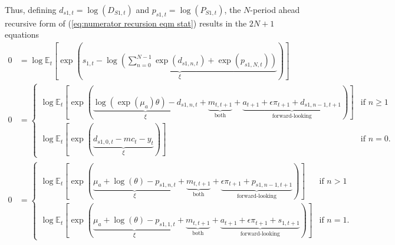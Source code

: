 \documentclass[12 pt, oneside]{article}
\theoremstyle{definition}
\theoremstyle{definition}
\theoremstyle{definition}
\newcommand{\E}{\mathbb{E}}
\begin{document}
Thus, defining $d_{s1, t} = \log(D_{S1, t})$ and $p_{s1, t} = \log(P_{S1, t})$,
the $N$-period ahead recursive form of (\ref{eq:numerator recursion eqm stat}) results in the $2N + 1$ equations
\begin{align}
  0 & = \log\E_t\left[\exp\left(\underbrace{s_{1, t} - \log\left(\sum_{n = 0}^{N - 1}\exp(d_{s1, n, t}) + \exp(p_{s1, N, t})\right)}_{\xi}\right)\right]\\
  0 & =
      \begin{cases}
        \log\E_t\left[\exp\left(\underbrace{\log(\exp(\mu_a)\theta) - d_{s1, n, t}}_{\xi} + \underbrace{m_{t, t + 1}}_{\text{both}} + \underbrace{a_{t + 1} + \epsilon \pi_{t + 1} + d_{s1, n - 1, t + 1}}_{\text{forward-looking}}\right)\right] & \text{if } n \geq 1\\
        \log\E_t\left[\exp\left(\underbrace{d_{s1, 0, t} - mc_t - y_t}_{\xi}\right)\right] & \text{if } n = 0.
      \end{cases}\\
  0 & =
      \begin{cases}
        \log\E_t\left[\exp\left(\underbrace{\mu_a + \log(\theta) - p_{s1, n, t}}_{\xi} + \underbrace{m_{t, t + 1}}_{\text{both}} + \underbrace{\epsilon \pi_{t + 1} + p_{s1, n - 1, t + 1}}_{\text{forward-looking}} \right)\right] & \text{if } n > 1\\
        \log\E_t\left[\exp\left(\underbrace{\mu_a + \log(\theta) - p_{s1, 1, t}}_{\xi} + \underbrace{m_{t, t + 1}}_{\text{both}} + \underbrace{a_{t + 1} + \epsilon \pi_{t + 1} + s_{1, t + 1}}_{\text{forward-looking}}\right)\right] & \text{if } n = 1.
      \end{cases}
\end{align}
\\
\end{document}
